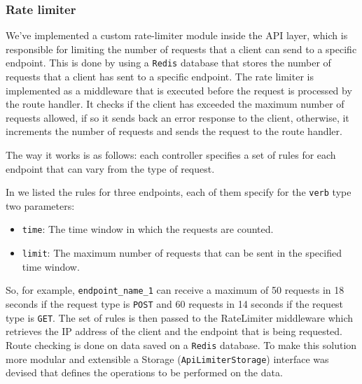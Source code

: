 \documentclass{scrartcl}
\begin{document}
\subsubsection{Rate limiter}
We've implemented a custom rate-limiter module inside the API layer, which is responsible for limiting the number of requests that a client can send to a specific endpoint. This is done by using a \texttt{Redis} database that stores the number of requests that a client has sent to a specific endpoint. The rate limiter is implemented as a middleware that is executed before the request is processed by the route handler. It checks if the client has exceeded the maximum number of requests allowed, if so it sends back an error response to the client, otherwise, it increments the number of requests and sends the request to the route handler.

The way it works is as follows: each controller specifies a set of rules for each endpoint that can vary from the type of request.


In  we listed the rules for three endpoints, each of them specify for the \texttt{verb} type two parameters:
\begin{itemize}
    \item \texttt{time}: The time window in which the requests are counted.
    \item \texttt{limit}: The maximum number of requests that can be sent in the specified time window.
\end{itemize}

So, for example, \texttt{endpoint\_name\_1} can receive a maximum of 50 requests in 18 seconds if the request type is \texttt{POST} and 60 requests in 14 seconds if the request type is \texttt{GET}.
The set of rules is then passed to the RateLimiter middleware which retrieves the IP address of the client and the endpoint that is being requested. 
Route checking is done on data saved on a \texttt{Redis} database. To make this solution more modular and extensible a Storage (\texttt{ApiLimiterStorage}) interface was devised that defines the operations to be performed on the data. 

\end{document}
